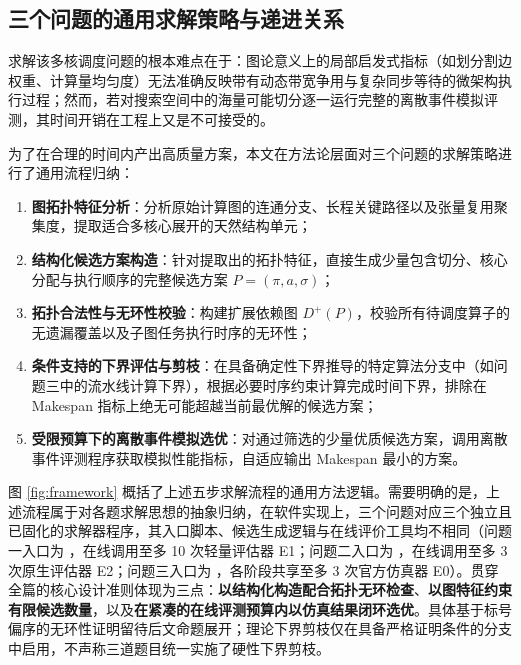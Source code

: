 \documentclass[anonymous,withtoc]{gmcm2026}
\providecommand{\tightlist}{\setlength{\itemsep}{0pt}\setlength{\parskip}{0pt}}
\begin{document}
\subsection{三个问题的通用求解策略与递进关系}

求解该多核调度问题的根本难点在于：图论意义上的局部启发式指标（如划分割边权重、计算量均匀度）无法准确反映带有动态带宽争用与复杂同步等待的微架构执行过程；然而，若对搜索空间中的海量可能切分逐一运行完整的离散事件模拟评测，其时间开销在工程上又是不可接受的。

为了在合理的时间内产出高质量方案，本文在方法论层面对三个问题的求解策略进行了通用流程归纳：

\begin{enumerate}
\def\labelenumi{\arabic{enumi}.}
\tightlist
\item
  \textbf{图拓扑特征分析}：分析原始计算图的连通分支、长程关键路径以及张量复用聚集度，提取适合多核心展开的天然结构单元；
\item
  \textbf{结构化候选方案构造}：针对提取出的拓扑特征，直接生成少量包含切分、核心分配与执行顺序的完整候选方案 \(P = (\pi, a, \sigma)\)；
\item
  \textbf{拓扑合法性与无环性校验}：构建扩展依赖图 \(D^+(P)\)，校验所有待调度算子的无遗漏覆盖以及子图任务执行时序的无环性；
\item
  \textbf{条件支持的下界评估与剪枝}：在具备确定性下界推导的特定算法分支中（如问题三中的流水线计算下界），根据必要时序约束计算完成时间下界，排除在 Makespan 指标上绝无可能超越当前最优解的候选方案；
\item
  \textbf{受限预算下的离散事件模拟选优}：对通过筛选的少量优质候选方案，调用离散事件评测程序获取模拟性能指标，自适应输出 Makespan 最小的方案。
\end{enumerate}

图 \ref{fig:framework} 概括了上述五步求解流程的通用方法逻辑。需要明确的是，上述流程属于对各题求解思想的抽象归纳，在软件实现上，三个问题对应三个独立且已固化的求解器程序，其入口脚本、候选生成逻辑与在线评价工具均不相同（问题一入口为 \texttt{}，在线调用至多 10 次轻量评估器 E1；问题二入口为 \texttt{}，在线调用至多 3 次原生评估器 E2；问题三入口为 \texttt{}，各阶段共享至多 3 次官方仿真器 E0）。贯穿全篇的核心设计准则体现为三点：\textbf{以结构化构造配合拓扑无环检查}、\textbf{以图特征约束有限候选数量}，以及\textbf{在紧凑的在线评测预算内以仿真结果闭环选优}。具体基于标号偏序的无环性证明留待后文命题展开；理论下界剪枝仅在具备严格证明条件的分支中启用，不声称三道题目统一实施了硬性下界剪枝。
\end{document}
